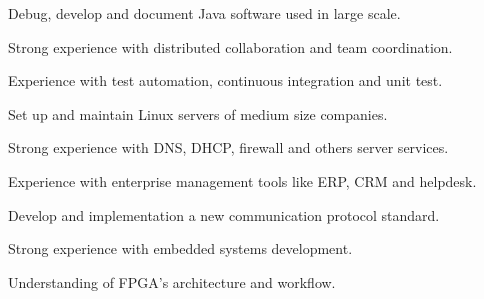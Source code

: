 \documentclass[]{willianpaixao-resume}
\begin{document}
\begin{minipage}[t]{0.64\textwidth}
\begin{tightemize}
\item Debug, develop and document Java software used in large scale.
\item Strong experience with distributed collaboration and team coordination.
\item Experience with test automation, continuous integration and unit test.
\end{tightemize}
\sectionsep


\begin{tightemize}
\item Set up and maintain Linux servers of medium size companies.
\item Strong experience with DNS, DHCP, firewall and others server services.
\item Experience with enterprise management tools like ERP, CRM and helpdesk.
\end{tightemize}
\sectionsep

\begin{tightemize}
\item Develop and implementation a new communication protocol standard.
\item Strong experience with embedded systems development.
\item Understanding of FPGA's architecture and workflow.
\end{tightemize}
\sectionsep


\end{minipage}
\end{document}
